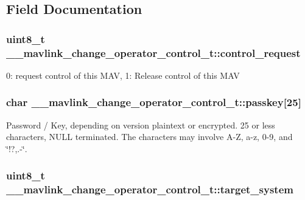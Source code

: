 \subsection{Field Documentation}
\hypertarget{struct____mavlink__change__operator__control__t_aef19fec531d51e7a3f57fe09a7f74c06}{
\subsubsection[{control\+\_\+request}]{\setlength{\rightskip}{0pt plus 5cm}uint8\+\_\+t \+\_\+\+\_\+mavlink\+\_\+change\+\_\+operator\+\_\+control\+\_\+t\+::control\+\_\+request}}\label{struct____mavlink__change__operator__control__t_aef19fec531d51e7a3f57fe09a7f74c06}


0\+: request control of this M\+A\+V, 1\+: Release control of this M\+A\+V 

\hypertarget{struct____mavlink__change__operator__control__t_ad18d971feb4c5e1826c0f6fde0085ab0}{
\subsubsection[{passkey}]{\setlength{\rightskip}{0pt plus 5cm}char \+\_\+\+\_\+mavlink\+\_\+change\+\_\+operator\+\_\+control\+\_\+t\+::passkey\mbox{[}25\mbox{]}}}\label{struct____mavlink__change__operator__control__t_ad18d971feb4c5e1826c0f6fde0085ab0}


Password / Key, depending on version plaintext or encrypted. 25 or less characters, N\+U\+L\+L terminated. The characters may involve A-\/\+Z, a-\/z, 0-\/9, and \char`\"{}!?,.-\/\char`\"{}. 

\hypertarget{struct____mavlink__change__operator__control__t_ac68f72fea3c066f00e0ccd0b978d119a}{
\subsubsection[{target\+\_\+system}]{\setlength{\rightskip}{0pt plus 5cm}uint8\+\_\+t \+\_\+\+\_\+mavlink\+\_\+change\+\_\+operator\+\_\+control\+\_\+t\+::target\+\_\+system}}\label{struct____mavlink__change__operator__control__t_ac68f72fea3c066f00e0ccd0b978d119a}


